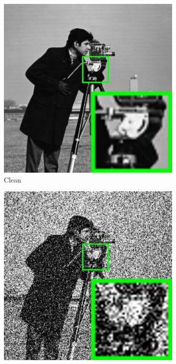 \begin{figure}
    \centering
    \begin{subfigure}[t]{0.24\textwidth}
        \centering
        \includegraphics[width=1\textwidth]{images/pgpd/pgdpd/br_cameraman.jpg}
	   \caption{Clean}
    \end{subfigure}
    \hfill
    \begin{subfigure}[t]{0.24\textwidth}
        \centering
        \includegraphics[width=1\textwidth]{images/pgpd/pgdpd/br_75_cameraman.jpg}

\end{subfigure}
\end{figure}
